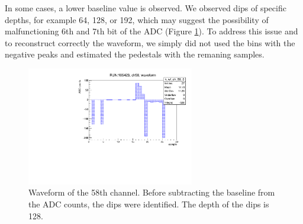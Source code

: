 In some cases, a lower baseline value is observed. 
We observed dips of specific depths, 
for example 64, 128, or 192, which may suggest the 
possibility of malfunctioning 6th 
and 7th bit of the ADC (Figure \ref{fig:dips}). 
To address this issue and to reconstruct 
correctly the waveform, we simply did not used the bins with the 
negative peaks and estimated the pedestals with 
the remaning samples.
\begin{figure}[!h]
  \centering
  \includegraphics[width=0.65\textwidth]{figures/pdf/wf_ch58_1.pdf}
  \caption[An example of waveform with dips.]{Waveform of the 58th channel. Before subtracting 
  the baseline from the ADC counts, the dips were identified. The depth of the dips is 128.}
 \label{fig:dips}
\end{figure}
